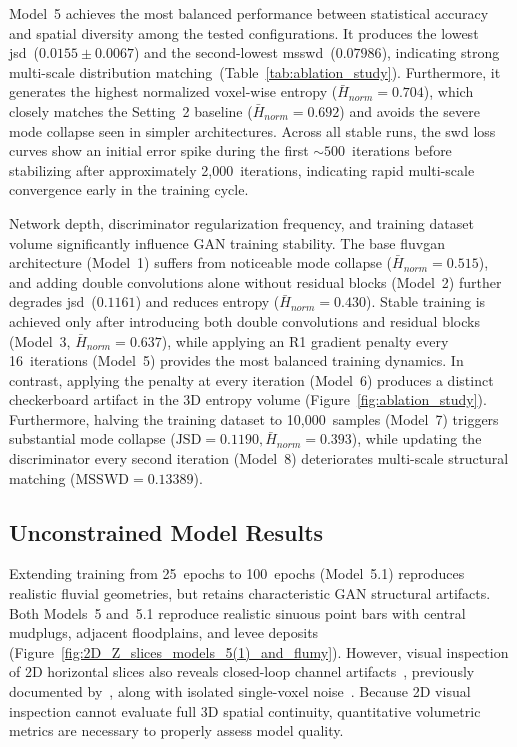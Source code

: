 Model~5 achieves the most balanced performance between statistical accuracy and spatial diversity among the tested configurations. It produces the lowest \gls{jsd}~($0.0155 \pm 0.0067$) and the second-lowest \gls{msswd}~($0.07986$), indicating strong multi-scale distribution matching~(Table~\ref{tab:ablation_study}). Furthermore, it generates the highest normalized voxel-wise entropy ($\bar{H}_{norm} = 0.704$), which closely matches the Setting~2 baseline ($\bar{H}_{norm} = 0.692$) and avoids the severe mode collapse seen in simpler architectures. Across all stable runs, the \gls{swd} loss curves show an initial error spike during the first $\sim 500$~iterations before stabilizing after approximately 2,000~iterations, indicating rapid multi-scale convergence early in the training cycle.

Network depth, discriminator regularization frequency, and training dataset volume significantly influence GAN training stability. The base \gls{fluvgan} architecture (Model~1) suffers from noticeable mode collapse ($\bar{H}_{norm} = 0.515$), and adding double convolutions alone without residual blocks (Model~2) further degrades \gls{jsd}~($0.1161$) and reduces entropy ($\bar{H}_{norm} = 0.430$). Stable training is achieved only after introducing both double convolutions and residual blocks (Model~3, $\bar{H}_{norm} = 0.637$), while applying an R1 gradient penalty every 16~iterations (Model~5) provides the most balanced training dynamics. In contrast, applying the penalty at every iteration (Model~6) produces a distinct checkerboard artifact in the 3D entropy volume (Figure~\ref{fig:ablation_study}). Furthermore, halving the training dataset to 10,000~samples (Model~7) triggers substantial mode collapse ($\text{JSD} = 0.1190, \bar{H}_{norm} = 0.393$), while updating the discriminator every second iteration (Model~8) deteriorates multi-scale structural matching ($\text{MSSWD} = 0.13389$).

\subsection{Unconstrained Model Results}
Extending training from 25~epochs to 100~epochs (Model~5.1) reproduces realistic fluvial geometries, but retains characteristic GAN structural artifacts. Both Models~5 and~5.1 reproduce realistic sinuous point bars with central mudplugs, adjacent floodplains, and levee deposits (Figure~\ref{fig:2D_Z_slices_models_5(1)_and_flumy}). However, visual inspection of 2D horizontal slices also reveals closed-loop channel artifacts~, previously documented by~\textcite{sun2023geological}, along with isolated single-voxel noise~. Because 2D visual inspection cannot evaluate full 3D spatial continuity, quantitative volumetric metrics are necessary to properly assess model quality.

